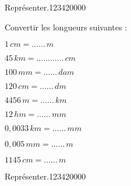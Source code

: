 \begin{pageAD} 

 
\begin{ExoCad}{Représenter.}{1234}{2}{0}{0}{0}{0}

 Convertir les longueurs suivantes :
 
\begin{enumerate} 
\begin{minipage}{0.3\linewidth}\vspace{0.2cm}
\item $1 \,cm =  \ldots\ldots \,m$ \vspace{0.2cm}
\item $45 \,km =  \ldots\ldots\ldots\ldots \,cm$\vspace{0.2cm}
\item $100 \,mm =  \ldots\ldots \,dam$\vspace{0.2cm}
\end{minipage}
 \hfill
\begin{minipage}{0.3  \linewidth}
\item $1 20 \,cm =  \ldots\ldots \,dm$\vspace{0.2cm}
\item $4456 \,m =  \ldots\ldots \,km$\vspace{0.2cm}
\item $12 \,hm =  \ldots\ldots \,mm$\vspace{0.2cm}
\end{minipage}
 \hfill
\begin{minipage}{0.3  \linewidth}
\item $0,0033 \,km =  \ldots\ldots \,mm$\vspace{0.2cm}
\item $0,005 \,mm =  \ldots\ldots \,m$\vspace{0.2cm}
\item $1145 \,cm = \ldots\ldots \,m$\vspace{0.2cm}
\end{minipage}

\end{enumerate} 
 
\end{ExoCad} 
  
\begin{ExoCad}{Représenter.}{1234}{2}{0}{0}{0}{0}
 
\begin{minipage}{.5\linewidth}
 

\end{minipage}
\end{ExoCad}
\end{pageAD}
